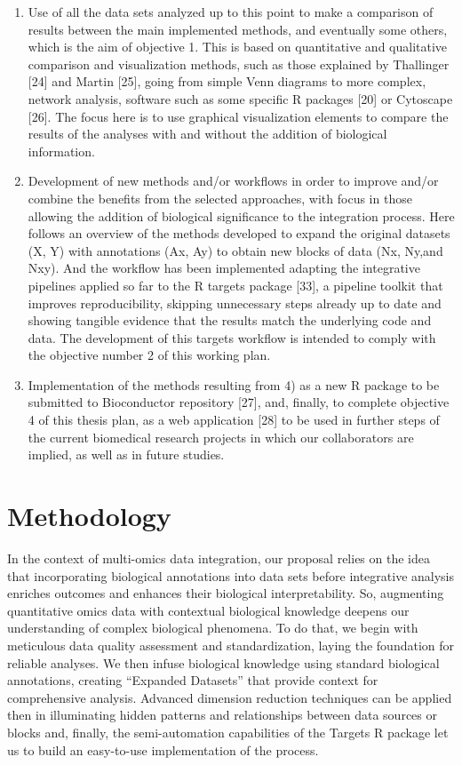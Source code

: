 \documentclass[a4paper, nobind]{templates/ociamthesis}
\begin{document}
\begin{enumerate}
\item
  Use of all the data sets analyzed up to this point to make a comparison of results between the main implemented methods, and eventually some others, which is the aim of objective 1. This is based on quantitative and qualitative comparison and visualization methods, such as those explained by Thallinger {[}24{]} and Martin {[}25{]}, going from simple Venn diagrams to more complex, network analysis, software such as some specific R packages {[}20{]} or Cytoscape {[}26{]}. The focus here is to use graphical visualization elements to compare the results of the analyses with and without the addition of biological information.
\item
  Development of new methods and/or workflows in order to improve and/or combine the benefits from the selected approaches, with focus in those allowing the addition of biological significance to the integration process. Here follows an overview of the methods developed to expand the original datasets (X, Y) with annotations (Ax, Ay) to obtain new blocks of data (Nx, Ny,and Nxy). And the workflow has been implemented adapting the integrative pipelines applied so far to the R targets package {[}33{]}, a pipeline toolkit that improves reproducibility, skipping unnecessary steps already up to date and showing tangible evidence that the results match the underlying code and data. The development of this targets workflow is intended to comply with the objective number 2 of this working plan.
\item
  Implementation of the methods resulting from 4) as a new R package to be submitted to Bioconductor repository {[}27{]}, and, finally, to complete objective 4 of this thesis plan, as a web application {[}28{]} to be used in further steps of the current biomedical research projects in which our collaborators are implied, as well as in future studies.
\end{enumerate}

\hypertarget{methodology}{%
\section{Methodology}\label{methodology}}

In the context of multi-omics data integration, our proposal relies on the idea that incorporating biological annotations into data sets before integrative analysis enriches outcomes and enhances their biological interpretability. So, augmenting quantitative omics data with contextual biological knowledge deepens our understanding of complex biological phenomena. To do that, we begin with meticulous data quality assessment and standardization, laying the foundation for reliable analyses. We then infuse biological knowledge using standard biological annotations, creating ``Expanded Datasets'' that provide context for comprehensive analysis. Advanced dimension reduction techniques can be applied then in illuminating hidden patterns and relationships between data sources or blocks and, finally, the semi-automation capabilities of the Targets R package let us to build an easy-to-use implementation of the process.
\end{document}
